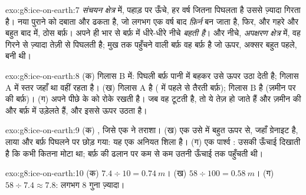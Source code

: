 \begin{solution}{exo:g8:ice-on-earth:7}
\emph{संचयन क्षेत्र} में, पहाड़ पर ऊँचे, हर वर्ष जितना  पिघलता है उससे ज़्यादा गिरता है।
नया  पुराने  को दबाता और ढकता है, जो लगभग एक वर्ष बाद \emph{फ़िर्न} बन जाता है,
फिर, और गहरे और बहुत बाद में, ठोस बर्फ़। अपने ही भार से बर्फ़  में धीरे-धीरे नीचे
\emph{बहती है}। और नीचे, \emph{अपक्षरण क्षेत्र} में, वह  गिरने से ज़्यादा तेज़ी से
पिघलती है; मुख तक पहुँचने वाली बर्फ़ वह बर्फ़ है जो ऊपर, अक्सर बहुत पहले,
बनी थी।
\end{solution}

\begin{solution}{exo:g8:ice-on-earth:8}
(क) गिलास B में: पिघली बर्फ़ पानी में बहकर उसे ऊपर उठा देती है; गिलास A में स्तर जहाँ
था वहीं रहता है। (ख) गिलास A  है ( में पहले से तैरती बर्फ़); गिलास B
 है (ज़मीन पर की बर्फ़)। (ग)  अपने पीछे के  को रोके रखती है।
जब वह टूटती है, तो ये  तेज़ हो जाते हैं और ज़मीन की और बर्फ़  में उड़ेलते हैं,
और इससे  ऊपर उठता है।
\end{solution}

\begin{solution}{exo:g8:ice-on-earth:9}
(क) , जिसे एक  ने तराशा। (ख) एक  उसे  में बहुत ऊपर से,
जहाँ ग्रेनाइट है, लाया और बर्फ़ पिघलने पर छोड़ गया: यह एक अनियत शिला है। (ग) एक पार्श्व
: उसकी ऊँचाई दिखाती है कि  कभी कितना मोटा था; बर्फ़  की ढलान पर कम से
कम उतनी ऊँचाई तक पहुँचती थी।
\end{solution}

\begin{solution}{exo:g8:ice-on-earth:10}
(क) $7.4 \div 10 = \qty{0.74}{m}$। (ख) $58 \div 100 = \qty{0.58}{m}$।
(ग) $58 \div 7.4 \approx 7.8$: लगभग 8 गुना ज़्यादा।
\end{solution}


